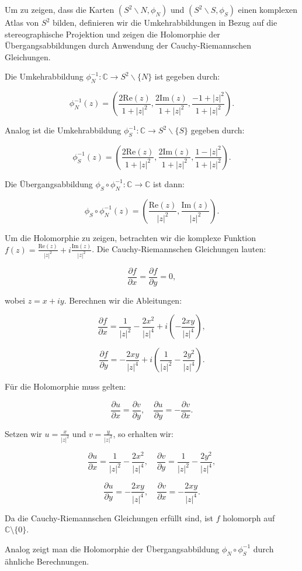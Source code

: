 Um zu zeigen, dass die Karten $\left(S^2 \backslash N, \phi_N\right)$ und $\left(S^2 \backslash S, \phi_S\right)$ einen komplexen Atlas von $S^2$ bilden, definieren wir die Umkehrabbildungen in Bezug auf die stereographische Projektion und zeigen die Holomorphie der Übergangsabbildungen durch Anwendung der Cauchy-Riemannschen Gleichungen.

Die Umkehrabbildung $\phi_N^{-1}: \mathbb{C} \to S^2 \backslash \{N\}$ ist gegeben durch:

\[
\phi_N^{-1}(z) = \left( \frac{2\text{Re}(z)}{1 + |z|^2}, \frac{2\text{Im}(z)}{1 + |z|^2}, \frac{-1 + |z|^2}{1 + |z|^2} \right).
\]

Analog ist die Umkehrabbildung $\phi_S^{-1}: \mathbb{C} \to S^2 \backslash \{S\}$ gegeben durch:

\[
\phi_S^{-1}(z) = \left( \frac{2\text{Re}(z)}{1 + |z|^2}, \frac{2\text{Im}(z)}{1 + |z|^2}, \frac{1 - |z|^2}{1 + |z|^2} \right).
\]

Die Übergangsabbildung $\phi_S \circ \phi_N^{-1}: \mathbb{C} \to \mathbb{C}$ ist dann:

\[
\phi_S \circ \phi_N^{-1}(z) = \left( \frac{\text{Re}(z)}{|z|^2}, \frac{\text{Im}(z)}{|z|^2} \right).
\]

Um die Holomorphie zu zeigen, betrachten wir die komplexe Funktion $f(z) = \frac{\text{Re}(z)}{|z|^2} + i\frac{\text{Im}(z)}{|z|^2}$. Die Cauchy-Riemannschen Gleichungen lauten:

\[
\frac{\partial f}{\partial x} = \frac{\partial f}{\partial y} = 0,
\]

wobei $z = x + iy$. Berechnen wir die Ableitungen:

\[
\frac{\partial f}{\partial x} = \frac{1}{|z|^2} - \frac{2x^2}{|z|^4} + i\left(-\frac{2xy}{|z|^4}\right),
\]

\[
\frac{\partial f}{\partial y} = -\frac{2xy}{|z|^4} + i\left(\frac{1}{|z|^2} - \frac{2y^2}{|z|^4}\right).
\]

Für die Holomorphie muss gelten:

\[
\frac{\partial u}{\partial x} = \frac{\partial v}{\partial y}, \quad \frac{\partial u}{\partial y} = -\frac{\partial v}{\partial x}.
\]

Setzen wir $u = \frac{x}{|z|^2}$ und $v = \frac{y}{|z|^2}$, so erhalten wir:

\[
\frac{\partial u}{\partial x} = \frac{1}{|z|^2} - \frac{2x^2}{|z|^4}, \quad \frac{\partial v}{\partial y} = \frac{1}{|z|^2} - \frac{2y^2}{|z|^4},
\]

\[
\frac{\partial u}{\partial y} = -\frac{2xy}{|z|^4}, \quad \frac{\partial v}{\partial x} = -\frac{2xy}{|z|^4}.
\]

Da die Cauchy-Riemannschen Gleichungen erfüllt sind, ist $f$ holomorph auf $\mathbb{C} \setminus \{0\}$.

Analog zeigt man die Holomorphie der Übergangsabbildung $\phi_N \circ \phi_S^{-1}$ durch ähnliche Berechnungen.

